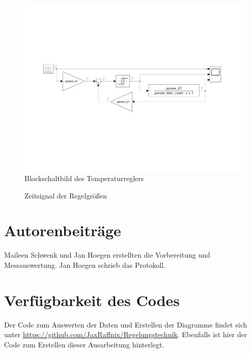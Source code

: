 \documentclass[
    paper=a4,
    fontsize=10pt,
    DIV=13,
    oneside,
]{scrartcl}
\begin{document}
    \begin{figure}
        \centering
        \includegraphics[width=1\imagewidth]{../versuch1/temp_regler_schaltbild.pdf}
        \caption{Blockschaltbild des Temperaturreglers}
        \label{fig:temp_regler_schaltbild}
    \end{figure}    

    \begin{figure}
        \centering
        
        \caption{Zeitsignal der Regelgrößen}
        \label{fig:temp_regler}
    \end{figure}


\printbibliography[heading=bibnumbered]

\section{Autorenbeiträge}
    Maileen Schwenk und Jan Hoegen erstellten die Vorbereitung und Messauswertung. Jan Hoegen schrieb das Protokoll.

\section{Verfügbarkeit des Codes}
    Der Code zum Auswerten der Daten und Erstellen der Diagramme findet sich unter \url{https://github.com/JaxRaffnix/Regelungstechnik}. Ebenfalls ist hier der Code zum Erstellen dieser Ausarbeitung hinterlegt.
\end{document}
